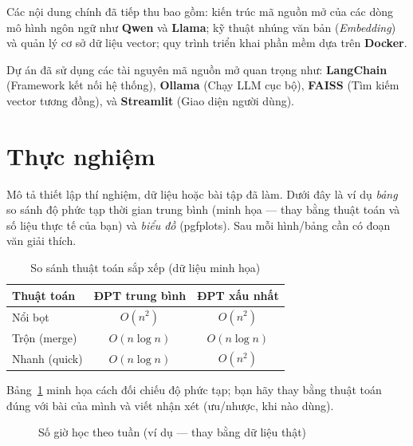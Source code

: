 \documentclass[10pt, conference, a4paper, compsocconf]{IEEEtran}
\begin{document}
Các nội dung chính đã tiếp thu bao gồm: kiến trúc mã nguồn mở của các dòng mô hình ngôn ngữ như \textbf{Qwen} và \textbf{Llama}; kỹ thuật nhúng văn bản (\textit{Embedding}) và quản lý cơ sở dữ liệu vector; quy trình triển khai phần mềm dựa trên \textbf{Docker}.

Dự án đã sử dụng các tài nguyên mã nguồn mở quan trọng như: \textbf{LangChain} (Framework kết nối hệ thống), \textbf{Ollama} (Chạy LLM cục bộ), \textbf{FAISS} (Tìm kiếm vector tương đồng), và \textbf{Streamlit} (Giao diện người dùng).
\section{Thực nghiệm}
Mô tả thiết lập thí nghiệm, dữ liệu hoặc bài tập đã làm. Dưới đây là ví dụ \emph{bảng} so sánh độ phức tạp thời gian trung bình (minh họa --- thay bằng thuật toán và số liệu thực tế của bạn) và \emph{biểu đồ} (pgfplots). Sau mỗi hình/bảng cần có đoạn văn giải thích.

\begin{table}[H]
\renewcommand{\arraystretch}{1.2}
\caption{So sánh thuật toán sắp xếp (dữ liệu minh họa)}
\label{tab:algo-compare}
\centering
\begin{tabular}{|l|c|c|}
\hline
Thuật toán & ĐPT trung bình & ĐPT xấu nhất \\
\hline
Nổi bọt & $O(n^2)$ & $O(n^2)$ \\
\hline
Trộn (merge) & $O(n\log n)$ & $O(n\log n)$ \\
\hline
Nhanh (quick) & $O(n\log n)$ & $O(n^2)$ \\
\hline
\end{tabular}
\end{table}

Bảng~\ref{tab:algo-compare} minh họa cách đối chiếu độ phức tạp; bạn hãy thay bằng thuật toán đúng với bài của mình và viết nhận xét (ưu/nhược, khi nào dùng).

\begin{figure}[H]
\centering
{}
\caption{Số giờ học theo tuần (ví dụ --- thay bằng dữ liệu thật)}
\label{fig:study-hours}
\end{figure}
\end{document}
